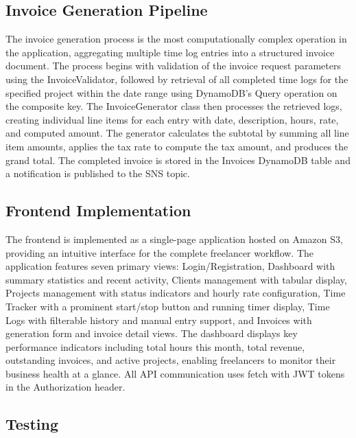 \documentclass[conference]{IEEEtran}
\begin{document}
\subsection{Invoice Generation Pipeline}

The invoice generation process is the most computationally complex operation in the application, aggregating multiple time log entries into a structured invoice document. The process begins with validation of the invoice request parameters using the InvoiceValidator, followed by retrieval of all completed time logs for the specified project within the date range using DynamoDB's Query operation on the composite key. The InvoiceGenerator class then processes the retrieved logs, creating individual line items for each entry with date, description, hours, rate, and computed amount. The generator calculates the subtotal by summing all line item amounts, applies the tax rate to compute the tax amount, and produces the grand total. The completed invoice is stored in the Invoices DynamoDB table and a notification is published to the SNS topic.

\subsection{Frontend Implementation}

The frontend is implemented as a single-page application hosted on Amazon S3, providing an intuitive interface for the complete freelancer workflow. The application features seven primary views: Login/Registration, Dashboard with summary statistics and recent activity, Clients management with tabular display, Projects management with status indicators and hourly rate configuration, Time Tracker with a prominent start/stop button and running timer display, Time Logs with filterable history and manual entry support, and Invoices with generation form and invoice detail views. The dashboard displays key performance indicators including total hours this month, total revenue, outstanding invoices, and active projects, enabling freelancers to monitor their business health at a glance. All API communication uses fetch with JWT tokens in the Authorization header.

\subsection{Testing}
\end{document}
